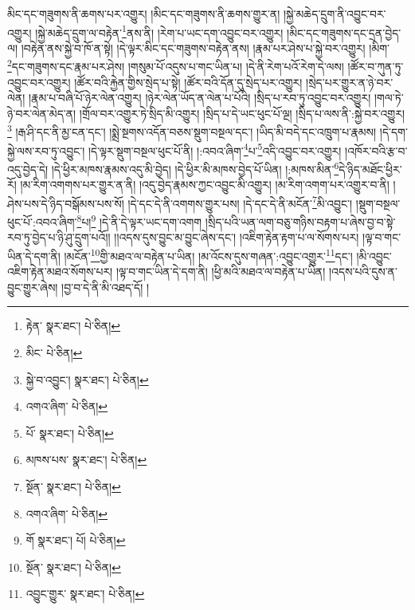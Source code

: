 མིང་དང་གཟུགས་ནི་ཆགས་པར་འགྱུར། །མིང་དང་གཟུགས་ནི་ཆགས་གྱུར་ན། །སྐྱེ་མཆེད་དྲུག་ནི་འབྱུང་བར་འགྱུར། །སྐྱེ་མཆེད་དྲུག་ལ་བརྟེན་\footnote{རྟེན་  སྣར་ཐང་།  པེ་ཅིན། }ནས་ནི། །རེག་པ་ཡང་དག་འབྱུང་བར་འགྱུར། །མིང་དང་གཟུགས་དང་དྲན་བྱེད་ལ། །བརྟེན་ནས་སྐྱེ་བ་ཁོ་ན་སྟེ། །དེ་ལྟར་མིང་དང་གཟུགས་བརྟེན་ནས། །རྣམ་པར་ཤེས་པ་སྐྱེ་བར་འགྱུར། །མིག་\footnote{མིང་  པེ་ཅིན། }དང་གཟུགས་དང་རྣམ་པར་ཤེས། །གསུམ་པོ་འདུས་པ་གང་ཡིན་པ། །དེ་ནི་རེག་པའོ་རེག་དེ་ལས། །ཚོར་བ་ཀུན་ཏུ་འབྱུང་བར་འགྱུར། །ཚོར་བའི་རྐྱེན་གྱིས་སྲེད་པ་སྟེ། །ཚོར་བའི་དོན་དུ་སྲེད་པར་འགྱུར། །སྲེད་པར་གྱུར་ན་ཉེ་བར་ལེན། །རྣམ་པ་བཞི་པོ་ཉེར་ལེན་འགྱུར། །ཉེར་ལེན་ཡོད་ན་ལེན་པ་པོའི། །སྲིད་པ་རབ་ཏུ་འབྱུང་བར་འགྱུར། །གལ་ཏེ་ཉེ་བར་ལེན་མེད་ན། །གྲོལ་བར་འགྱུར་ཏེ་སྲིད་མི་འགྱུར། །སྲིད་པ་དེ་ཡང་ཕུང་པོ་ལྔ། །སྲིད་པ་ལས་ནི་:སྐྱེ་བར་འགྱུར།\footnote{སྐྱེ་བ་འབྱུང་།  སྣར་ཐང་།  པེ་ཅིན། } །རྒ་ཤི་དང་ནི་མྱ་ངན་དང་། །སྨྲེ་སྔགས་འདོན་བཅས་སྡུག་བསྔལ་དང་། །ཡིད་མི་བདེ་དང་འཁྲུག་པ་རྣམས། །དེ་དག་སྐྱེ་ལས་རབ་ཏུ་འབྱུང་། །དེ་ལྟར་སྡུག་བསྔལ་ཕུང་པོ་ནི། །:འབའ་ཞིག་\footnote{འགའ་ཞིག་  པེ་ཅིན། }པ་\footnote{པོ་  སྣར་ཐང་།  པེ་ཅིན། }འདི་འབྱུང་བར་འགྱུར། །འཁོར་བའི་རྩ་བ་འདུ་བྱེད་དེ། །དེ་ཕྱིར་མཁས་རྣམས་འདུ་མི་བྱེད། །དེ་ཕྱིར་མི་མཁས་བྱེད་པོ་ཡིན། །:མཁས་མིན་\footnote{མཁས་པས་  སྣར་ཐང་།  པེ་ཅིན། }དེ་ཉིད་མཐོང་ཕྱིར་རོ། །མ་རིག་འགགས་པར་གྱུར་ན་ནི། །འདུ་བྱེད་རྣམས་ཀྱང་འབྱུང་མི་འགྱུར། །མ་རིག་འགག་པར་འགྱུར་བ་ནི། །ཤེས་པས་དེ་ཉིད་བསྒོམས་པས་སོ། །དེ་དང་དེ་ནི་འགགས་གྱུར་པས། །དེ་དང་དེ་ནི་མངོན་\footnote{སྔོན་  སྣར་ཐང་།  པེ་ཅིན། }མི་འབྱུང་། །སྡུག་བསྔལ་ཕུང་པོ་:འབའ་ཞིག་\footnote{འགའ་ཞིག་  པེ་ཅིན། }པ།\footnote{གོ  སྣར་ཐང་། པོ།  པེ་ཅིན། } །དེ་ནི་དེ་ལྟར་ཡང་དག་འགག །སྲིད་པའི་ཡན་ལག་བཅུ་གཉིས་བརྟག་པ་ཞེས་བྱ་བ་སྟེ་རབ་ཏུ་བྱེད་པ་ཉི་ཤུ་དྲུག་པའོ།། །།འདས་དུས་བྱུང་མ་བྱུང་ཞེས་དང་། །འཇིག་རྟེན་རྟག་པ་ལ་སོགས་པར། །ལྟ་བ་གང་ཡིན་དེ་དག་ནི། །མངོན་\footnote{སྔོན་  སྣར་ཐང་།  པེ་ཅིན། }གྱི་མཐའ་ལ་བརྟེན་པ་ཡིན། །མ་འོངས་དུས་གཞན་:འབྱུང་འགྱུར་\footnote{འབྱུང་གྱུར་  སྣར་ཐང་།  པེ་ཅིན། }དང་། །མི་འབྱུང་འཇིག་རྟེན་མཐའ་སོགས་པར། །ལྟ་བ་གང་ཡིན་དེ་དག་ནི། །ཕྱི་མའི་མཐའ་ལ་བརྟེན་པ་ཡིན། །འདས་པའི་དུས་ན་བྱུང་གྱུར་ཞེས། །བྱ་བ་དེ་ནི་མི་འཐད་དོ། །

